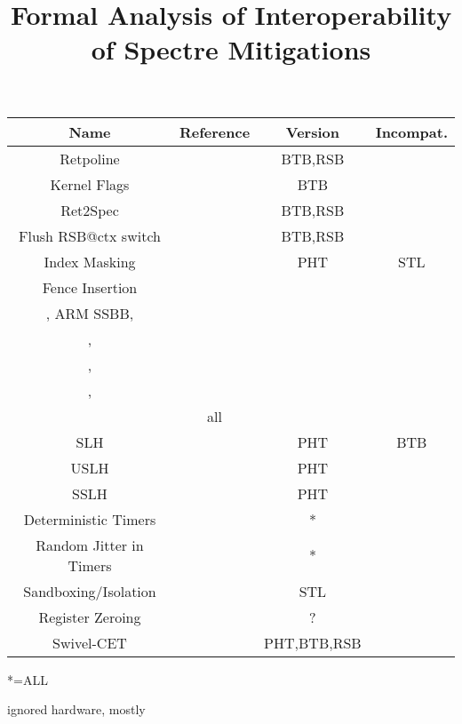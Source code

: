 \documentclass[a4paper,12pt]{article}
\date{}
\title{Formal Analysis of Interoperability of Spectre Mitigations}
\begin{document}
\maketitle

\begin{center}
  \begin{tabular}{|c|c|c|c|}
    \hline
    Name      & 
    Reference        &
    Version &
    Incompat.
    \\
    \hline
    Retpoline & 
    \cite{retpoline,gretpoline} &
    BTB,RSB &
    \\
    Kernel Flags & 
    \cite{ipredd} &
    BTB &
    \\
    Ret2Spec &
    \cite{maisuradze2018ret2spec} &
    BTB,RSB &
    \\
    Flush RSB@ctx switch &
    \cite{maisuradze2018ret2spec} &
    BTB,RSB &
    \\
    Index Masking &
    \cite{Daniel2021HuntingTH} &
    PHT &
    STL
    \\
    Fence Insertion &
    \makecell{
      \cite{Daniel2021HuntingTH}, \\
      \cite{ssbd}, ARM SSBB,\\
      \cite{vassena2021blade}, \\
      \cite{maisuradze2018ret2spec}, \\
      \cite{bhattacharyya2019smotherspectre}, \\
      \cite{mosier2023serberus}
    } &
    all &
    \\
    SLH &
    \cite{slh} &
    PHT &
    BTB \\
    USLH &
    \cite{zhang2023uslh} &
    PHT &
    \\
    SSLH &
    \cite{patrignani2021exorcising} &
    PHT &
    \\
    Deterministic Timers &
    \cite{cao2017detbrowser} &
    * & 
    \\
    Random Jitter in Timers &
    \cite{kohlbrenner2016fuzzyfox} &
    * & 
    \\
    Sandboxing/Isolation &
    \cite{isolation,mosier2023serberus} &
    STL & 
    \\
    Register Zeroing &
    \cite{mosier2023serberus} &
    ? & 
    \\
    Swivel-CET &
    \cite{narayan2021swivel} &
    PHT,BTB,RSB &
    \\
    \hline
  \end{tabular}
\end{center}
*=ALL

ignored hardware, mostly

\clearpage



\printglossary
\end{document}
